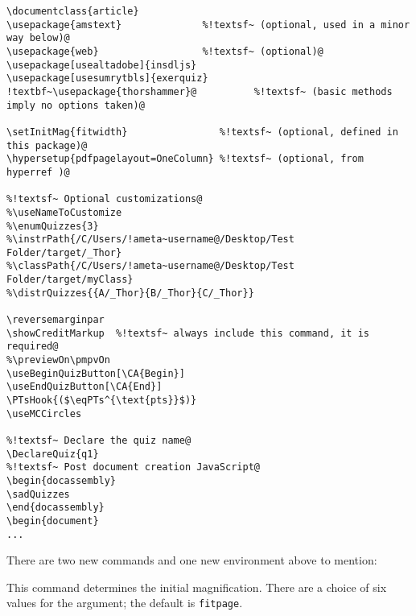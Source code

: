 \documentclass{article}
\edef\amtIndent{\the\parindent}
\begin{document}
\begin{Verbatim}[xleftmargin=\amtIndent,fontsize=\small,commandchars={!~@}]
\documentclass{article}
\usepackage{amstext}              %!textsf~ (optional, used in a minor way below)@
\usepackage{web}                  %!textsf~ (optional)@
\usepackage[usealtadobe]{insdljs}
\usepackage[usesumrytbls]{exerquiz}
!textbf~\usepackage{thorshammer}@          %!textsf~ (basic methods imply no options taken)@

\setInitMag{fitwidth}                %!textsf~ (optional, defined in this package)@
\hypersetup{pdfpagelayout=OneColumn} %!textsf~ (optional, from hyperref )@

%!textsf~ Optional customizations@
%\useNameToCustomize
%\enumQuizzes{3}
%\instrPath{/C/Users/!ameta~username@/Desktop/Test Folder/target/_Thor}
%\classPath{/C/Users/!ameta~username@/Desktop/Test Folder/target/myClass}
%\distrQuizzes{{A/_Thor}{B/_Thor}{C/_Thor}}

\reversemarginpar
\showCreditMarkup  %!textsf~ always include this command, it is required@
%\previewOn\pmpvOn
\useBeginQuizButton[\CA{Begin}]
\useEndQuizButton[\CA{End}]
\PTsHook{($\eqPTs^{\text{pts}}$)}
\useMCCircles

%!textsf~ Declare the quiz name@
\DeclareQuiz{q1}
%!textsf~ Post document creation JavaScript@
\begin{docassembly}
\sadQuizzes
\end{docassembly}
\begin{document}
...
\end{Verbatim}
There are two new commands and one new environment above to mention:
\bVerb\small{}%
\begin{dCmd}[fontsize=\small]{\bxSize}
\end{dCmd}
\eVerb This command determines the initial magnification. There are a choice
of six values for the argument; the default is \texttt{fitpage}.
\end{document}
